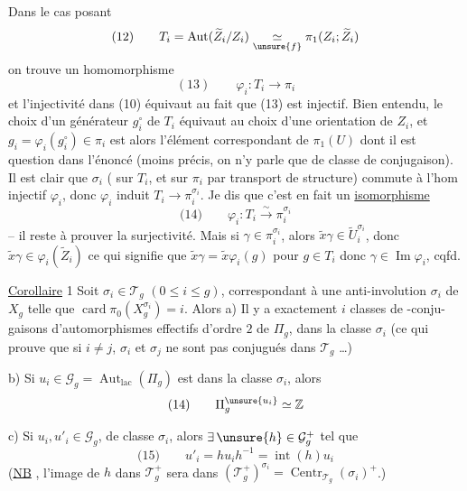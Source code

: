 Dans le cas   posant
\[
(12)\qquad T_i=\operatorname{Aut}(\widetilde Z_i/Z_i)\underset{\unsure{f}}{\simeq}\pi_1(Z_i;\widetilde Z_i)
\]
on trouve un homomorphisme 
\[
(13)\qquad \varphi_i:T_i\longrightarrow\pi_i
\]
et l'injectivité dans (10) équivaut au fait
que (13) est injectif. Bien entendu,
le choix d'un générateur $g_i^{\circ}$ de $T_i$ équivaut au
choix d'une orientation de $Z_i$, et
$g_i=\varphi_i(g_i^{\circ})\in\pi_i$ est alors l'élément correspondant
de $\pi_1(U)$ dont il est question dans
l'énoncé (moins précis,  on n'y parle que
de classe de conjugaison). Il est clair
que $\sigma_i$ (  sur $T_i$, et sur $\pi_i$
par transport de structure) commute à
l'hom injectif $\varphi_i$, donc  $\varphi_i$
induit  $T_i\longrightarrow\pi_i^{\sigma_i}$. Je dis que
c'est en fait un \uline{isomorphisme}
\[
\text{(14)}\qquad \varphi_i:T_i\xrightarrow{\sim}\pi_i^{\sigma_i}
\]
-- il reste à prouver la surjectivité. Mais
si $\gamma\in\pi_i^{\sigma_i}$, alors $\widetilde{x}\gamma\in\widetilde{U}_i^{\sigma_i}$, donc
$\widetilde{x}\gamma\in\varphi_i(\widetilde{Z}_i)$ ce qui signifie que
$\widetilde{x}\gamma=\widetilde{x}\varphi_i(g)$  pour $g\in T_i$ donc
$\gamma\in\operatorname{Im}\varphi_i$, cqfd.

\uline{Corollaire} 1 Soit $\sigma_i\in\mathcal{T}_g$ $(0\leq i\leq g)$,
correspondant à une anti-involution $\sigma_i$ de
$X_g$ telle que $\operatorname{card}\pi_0(X_g^{\sigma_i})=i$. Alors
a) Il y a exactement $i$ classes de -conju-
gaisons d'automorphismes effectifs d'ordre $2$
de $\Pi_g$, dans la classe $\sigma_i$ (ce qui prouve
que si $i\neq j$, $\sigma_i$ et $\sigma_j$ ne sont pas
conjugués dans $\mathcal{T}_g$  \dots)

b) Si $u_i\in\mathcal{G}_g=\operatorname{Aut}_{\mathrm{lac}}(\Pi_g)$ est  dans la
classe $\sigma_i$, alors 
\[
\text{(14)}\qquad \Pi_g^{\unsure{u_i}}\simeq\mathbb{Z}
\]

c) Si $u_i,u'_i\in\mathcal{G}_g$, 
 de classe $\sigma_i$, alors $\exists\,\unsure{h}\in\mathcal{G}_g^+$
tel que
\[
\text{(15)}\qquad u'_i=hu_ih^{-1}=\operatorname{int}(h)u_i
\]
(\uline{NB} , l'image de $h$ dans $\mathcal{T}_g^+$
sera dans $(\mathcal{T}_g^+)^{\sigma_i}=\operatorname{Centr}_{\mathcal{T}_g}(\sigma_i)^+$.)

